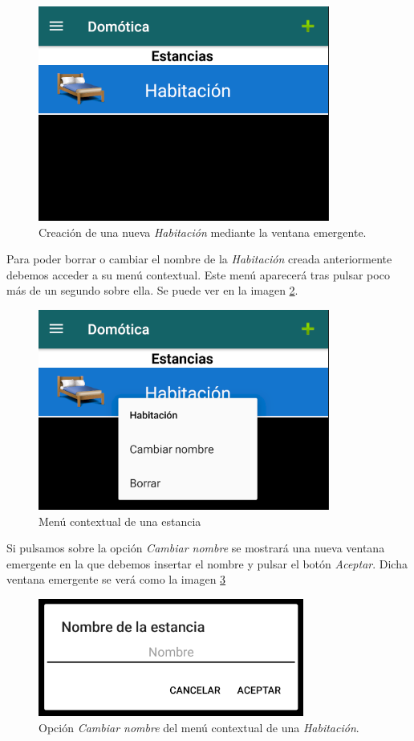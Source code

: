 \begin{figure}[h!]
	\centering
	\includegraphics[width=0.5\linewidth]{img/ventanaPrincipalHabitacion}
	\caption{Creación de una nueva \textit{Habitación} mediante la ventana emergente.}
	\label{fig:ventanaPrincipalHabitacion}
\end{figure}

Para poder borrar o cambiar el nombre de la \textit{Habitación} creada anteriormente debemos acceder a su menú contextual. Este menú aparecerá tras pulsar poco más de un segundo sobre ella. Se puede ver en la imagen \ref{fig:menuContextual}.

\begin{figure}[h!]
	\centering
	\includegraphics[width=0.6\linewidth]{img/menuContextual}
	\caption{Menú contextual de una estancia}
	\label{fig:menuContextual}
\end{figure}

Si pulsamos sobre la opción \textit{Cambiar nombre} se mostrará una nueva ventana emergente en la que debemos insertar el nombre y pulsar el botón \textit{Aceptar}. Dicha ventana emergente se verá como la imagen \ref{fig:cambiarNombre}

\begin{figure}[h!]
	\centering
	\includegraphics[width=0.6\linewidth]{img/cambiarNombre}
	\caption{Opción \textit{Cambiar nombre} del menú contextual de una \textit{Habitación}.}
	\label{fig:cambiarNombre}
\end{figure}

